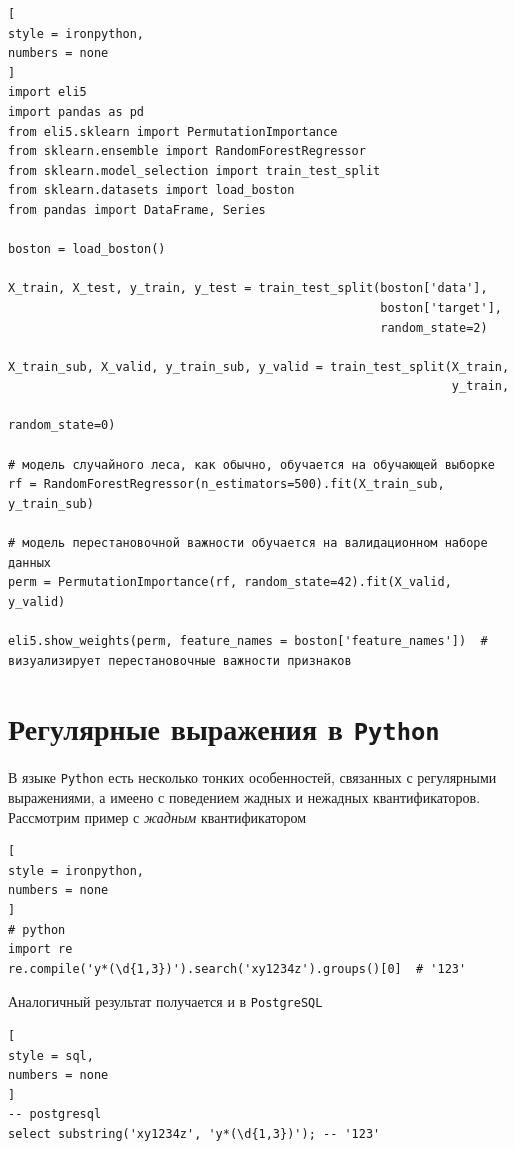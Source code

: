 \documentclass[%
	11pt,
	a4paper,
	utf8,
		]{article}
\begin{document}
\begin{lstlisting}[
style = ironpython,
numbers = none
]
import eli5
import pandas as pd
from eli5.sklearn import PermutationImportance
from sklearn.ensemble import RandomForestRegressor
from sklearn.model_selection import train_test_split
from sklearn.datasets import load_boston
from pandas import DataFrame, Series

boston = load_boston()

X_train, X_test, y_train, y_test = train_test_split(boston['data'],
                                                    boston['target'], 
                                                    random_state=2)

X_train_sub, X_valid, y_train_sub, y_valid = train_test_split(X_train,
                                                              y_train,
                                                              random_state=0)

# модель случайного леса, как обычно, обучается на обучающей выборке
rf = RandomForestRegressor(n_estimators=500).fit(X_train_sub, y_train_sub)

# модель перестановочной важности обучается на валидационном наборе данных
perm = PermutationImportance(rf, random_state=42).fit(X_valid, y_valid)

eli5.show_weights(perm, feature_names = boston['feature_names'])  # визуализирует перестановочные важности признаков
\end{lstlisting}

\section{Регулярные выражения в \texttt{Python}}

В языке \texttt{Python} есть несколько тонких особенностей, связанных с регулярными выражениями, а имеено с поведением жадных и нежадных квантификаторов. Рассмотрим пример с \emph{жадным} квантификатором
\begin{lstlisting}[
style = ironpython,
numbers = none
]
# python
import re
re.compile('y*(\d{1,3})').search('xy1234z').groups()[0]  # '123'
\end{lstlisting}

Аналогичный результат получается и в \texttt{PostgreSQL}
\begin{lstlisting}[
style = sql,
numbers = none
]
-- postgresql
select substring('xy1234z', 'y*(\d{1,3})'); -- '123'
\end{lstlisting}
\end{document}

